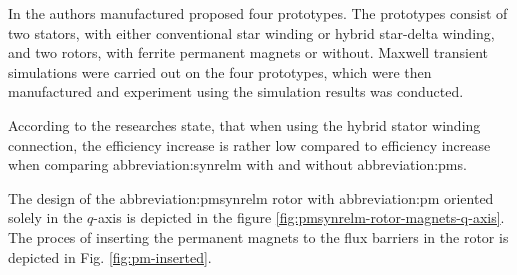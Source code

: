 \documentclass[a4paper, twoside, 11pt]{article}
\begin{document}
        In \cite{ibrahim-permanent-magnet-assisted-synchronous-reluctance-motor-employing-a-hybrid-star-delta-winding-for-high-speed-applicaitons} the authors manufactured proposed four prototypes. The prototypes consist of two stators, with either conventional star winding or hybrid star-delta winding, and two rotors, with ferrite permanent magnets or without. Maxwell transient simulations were carried out on the four prototypes, which were then manufactured and experiment using the simulation results was conducted.
\par
    According to \cite{ibrahim-permanent-magnet-assisted-synchronous-reluctance-motor-employing-a-hybrid-star-delta-winding-for-high-speed-applicaitons} the researches state, that when using the hybrid stator winding connection, the efficiency increase is rather low compared to efficiency increase when comparing \gls{abbreviation:synrelm} with and without \gls{abbreviation:pm}s.\par
    The design of the \gls{abbreviation:pmsynrelm} rotor with \gls{abbreviation:pm} oriented solely in the $q$-axis is depicted in the figure \ref{fig:pmsynrelm-rotor-magnets-q-axis}. The proces of inserting the permanent magnets to the flux barriers in the rotor is depicted in Fig. \ref{fig:pm-inserted}.
    
\end{document}
